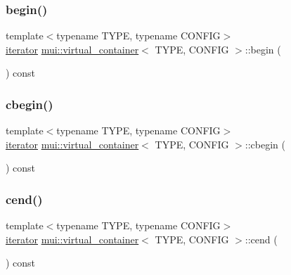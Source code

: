 \subsubsection{\texorpdfstring{begin()}{begin()}}
{\footnotesize\ttfamily template$<$typename T\+Y\+PE, typename C\+O\+N\+F\+IG$>$ \\
\hyperlink{classmui_1_1virtual__container_ab8a791b2f30b5a59f0bcc06b417d10fc}{iterator} \hyperlink{classmui_1_1virtual__container}{mui\+::virtual\+\_\+container}$<$ T\+Y\+PE, C\+O\+N\+F\+IG $>$\+::begin (\begin{DoxyParamCaption}{ }\end{DoxyParamCaption}) const\hspace{0.3cm}{\ttfamily [inline]}}

\mbox{\label{classmui_1_1virtual__container_ab25d7d316e92bcc77b9b30de829234db}} 
\subsubsection{\texorpdfstring{cbegin()}{cbegin()}}
{\footnotesize\ttfamily template$<$typename T\+Y\+PE, typename C\+O\+N\+F\+IG$>$ \\
\hyperlink{classmui_1_1virtual__container_ab8a791b2f30b5a59f0bcc06b417d10fc}{iterator} \hyperlink{classmui_1_1virtual__container}{mui\+::virtual\+\_\+container}$<$ T\+Y\+PE, C\+O\+N\+F\+IG $>$\+::cbegin (\begin{DoxyParamCaption}{ }\end{DoxyParamCaption}) const\hspace{0.3cm}{\ttfamily [inline]}}

\mbox{\label{classmui_1_1virtual__container_a87cfc003f2b57359a72857907aaa2054}} 
\subsubsection{\texorpdfstring{cend()}{cend()}}
{\footnotesize\ttfamily template$<$typename T\+Y\+PE, typename C\+O\+N\+F\+IG$>$ \\
\hyperlink{classmui_1_1virtual__container_ab8a791b2f30b5a59f0bcc06b417d10fc}{iterator} \hyperlink{classmui_1_1virtual__container}{mui\+::virtual\+\_\+container}$<$ T\+Y\+PE, C\+O\+N\+F\+IG $>$\+::cend (\begin{DoxyParamCaption}{ }\end{DoxyParamCaption}) const\hspace{0.3cm}{\ttfamily [inline]}}

